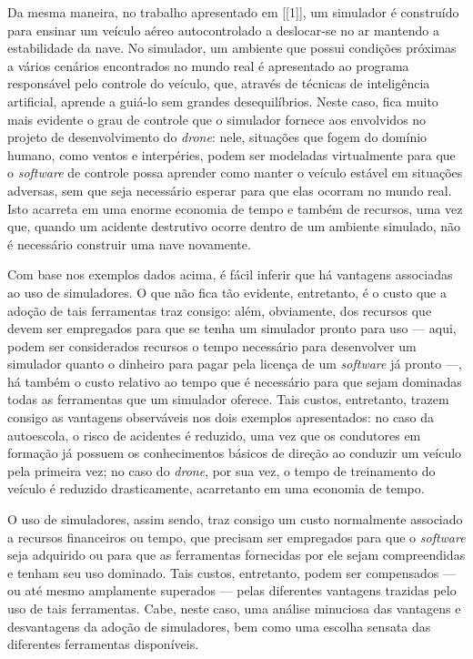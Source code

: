 \documentclass[cic,tc]{iiufrgs}
\begin{document}
Da mesma maneira, no trabalho apresentado em [[1]], um simulador é construído
para ensinar um veículo aéreo autocontrolado a deslocar-se no ar mantendo a
estabilidade da nave. No simulador, um ambiente que possui condições próximas
a vários cenários encontrados no mundo real é apresentado ao programa
responsável pelo controle do veículo, que, através de técnicas de inteligência
artificial, aprende a guiá-lo sem grandes desequilíbrios. Neste caso, fica muito
mais evidente o grau de controle que o simulador fornece aos envolvidos no
projeto de desenvolvimento do \textit{drone}: nele, situações que fogem do
domínio humano, como ventos e interpéries, podem ser modeladas virtualmente para
que o \textit{software} de controle possa aprender como manter o veículo estável
em situações adversas, sem que seja necessário esperar para que elas ocorram no
mundo real. Isto acarreta em uma enorme economia de tempo e também de recursos,
uma vez que, quando um acidente destrutivo ocorre dentro de um ambiente
simulado, não é necessário construir uma nave novamente.


Com base nos exemplos dados acima, é fácil inferir que há vantagens associadas
ao uso de simuladores. O que não fica tão evidente, entretanto, é o custo que a
adoção de tais ferramentas traz consigo: além, obviamente, dos recursos que
devem ser empregados para que se tenha um simulador pronto para uso --- aqui,
podem ser considerados recursos o tempo necessário para desenvolver um simulador
quanto o dinheiro para pagar pela licença de um \textit{software} já pronto ---,
há também o custo relativo ao tempo que é necessário para que sejam dominadas
todas as ferramentas que um simulador oferece. Tais custos, entretanto, trazem
consigo as vantagens observáveis nos dois exemplos apresentados: no caso da
autoescola, o risco de acidentes é reduzido, uma vez que os condutores em
formação já possuem os conhecimentos básicos de direção ao conduzir um veículo
pela primeira vez; no caso do \textit{drone}, por sua vez, o tempo de
treinamento do veículo é reduzido drasticamente, acarretanto em uma economia de
tempo.


O uso de simuladores, assim sendo, traz consigo um custo normalmente associado
a recursos financeiros ou tempo, que precisam ser empregados para que o
\textit{software} seja adquirido ou para que as ferramentas fornecidas por ele
sejam compreendidas e tenham seu uso dominado. Tais custos, entretanto, podem
ser compensados --- ou até mesmo amplamente superados --- pelas diferentes
vantagens trazidas pelo uso de tais ferramentas. Cabe, neste caso, uma análise
minuciosa das vantagens e desvantagens da adoção de simuladores, bem como uma
escolha sensata das diferentes ferramentas disponíveis.
\end{document}
